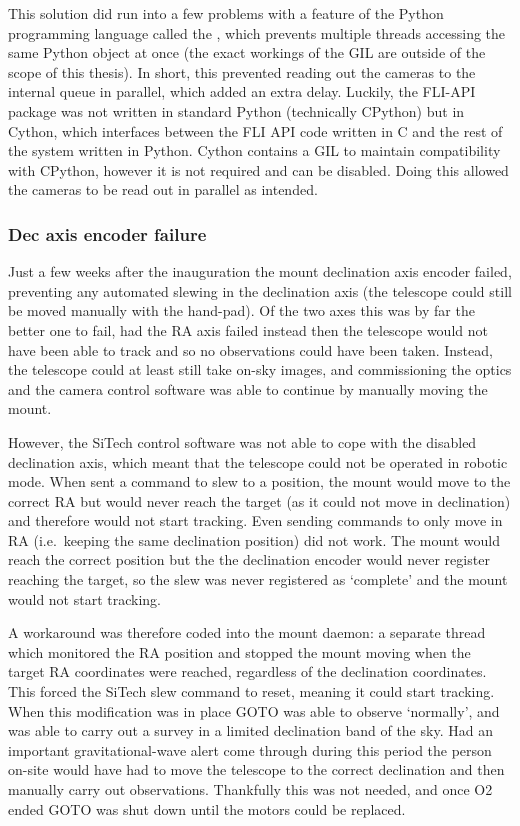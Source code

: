 \begin{colsection}
This solution did run into a few problems with a feature of the Python programming language called the , which prevents multiple threads accessing the same Python object at once (the exact workings of the GIL are outside of the scope of this thesis). In short, this prevented reading out the cameras to the internal queue in parallel, which added an extra delay. Luckily, the FLI-API package was not written in standard Python (technically CPython) but in Cython, which interfaces between the FLI API code written in C and the rest of the system written in Python. Cython contains a GIL to maintain compatibility with CPython, however it is not required and can be disabled. Doing this allowed the cameras to be read out in parallel as intended.

\subsubsection{Dec axis encoder failure}

Just a few weeks after the inauguration the mount declination axis encoder failed, preventing any automated slewing in the declination axis (the telescope could still be moved manually with the hand-pad). Of the two axes this was by far the better one to fail, had the RA axis failed instead then the telescope would not have been able to track and so no observations could have been taken. Instead, the telescope could at least still take on-sky images, and commissioning the optics and the camera control software was able to continue by manually moving the mount.

However, the SiTech control software was not able to cope with the disabled declination axis, which meant that the telescope could not be operated in robotic mode. When sent a command to slew to a position, the mount would move to the correct RA but would never reach the target (as it could not move in declination) and therefore would not start tracking. Even sending commands to only move in RA (i.e.\ keeping the same declination position) did not work. The mount would reach the correct position but the the declination encoder would never register reaching the target, so the slew was never registered as `complete' and the mount would not start tracking.

A workaround was therefore coded into the mount daemon: a separate thread which monitored the RA position and stopped the mount moving when the target RA coordinates were reached, regardless of the declination coordinates. This forced the SiTech slew command to reset, meaning it could start tracking. When this modification was in place GOTO was able to observe `normally', and was able to carry out a survey in a limited declination band of the sky. Had an important gravitational-wave alert come through during this period the person on-site would have had to move the telescope to the correct declination and then manually carry out observations. Thankfully this was not needed, and once O2 ended GOTO was shut down until the motors could be replaced.


\end{colsection}
